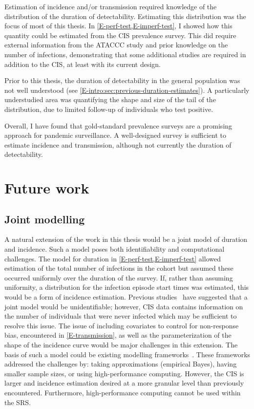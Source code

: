 \documentclass[thesis.tex]{subfiles}
\begin{document}
Estimation of incidence and/or transmission required knowledge of the distribution of the duration of detectability.
Estimating this distribution was the focus of most of this thesis.
In \cref{E-perf-test,E-imperf-test}, I showed how this quantity could be estimated from the CIS prevalence survey.
This did require external information from the ATACCC study and prior knowledge on the number of infections, demonstrating that some additional studies are required in addition to the CIS, at least with its current design.

Prior to this thesis, the duration of detectability in the general population was not well understood (see \cref{E-intro:sec:previous-duration-estimates}).
A particularly understudied area was quantifying the shape and size of the tail of the distribution, due to limited follow-up of individuals who test positive.

Overall, I have found that gold-standard prevalence surveys are a promising approach for pandemic surveillance.
A well-designed survey is sufficient to estimate incidence and transmission, although not currently the duration of detectability.


\section{Future work} \label{conclusion:sec:future-work}

\subsection{Joint modelling}

A natural extension of the work in this thesis would be a joint model of duration and incidence.
Such a model poses both identifiability and computational challenges.
The model for duration in \cref{E-perf-test,E-imperf-test} allowed estimation of the total number of infections in the cohort but assumed these occurred uniformly over the duration of the survey.
If, rather than assuming uniformity, a distribution for the infection episode start times was estimated, this would be a form of incidence estimation.
Previous studies~\autocite[e.g.][]{bacchettiNonparametric} have suggested that a joint model would be unidentifiable; however, CIS data contains information on the number of individuals that were never infected which may be sufficient to resolve this issue.
The issue of including covariates to control for non-response bias, encountered in \cref{E-transmission}, as well as the parameterization of the shape of the incidence curve would be major challenges in this extension.
The basis of such a model could be existing modelling frameworks~\autocite[e.g.][]{taffeJoint,haySerosolver}.
These frameworks addressed the challenges by: taking approximations (\eg empirical Bayes), having smaller sample sizes, or using high-performance computing.
However, the CIS is larger and incidence estimation desired at a more granular level than previously encountered.
Furthermore, high-performance computing cannot be used within the SRS.
\end{document}
